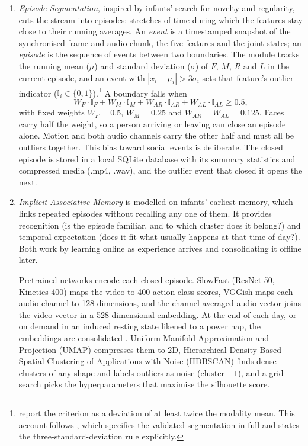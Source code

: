 \begin{enumerate}
    \item \emph{Episode Segmentation}, inspired by infants' search for novelty and regularity, cuts the stream into episodes: stretches of time during which the features stay close to their running averages. An \emph{event} is a timestamped snapshot of the synchronised frame and audio chunk, the five features and the joint states; an \emph{episode} is the sequence of events between two boundaries. The module tracks the running mean ($\mu$) and standard deviation ($\sigma$) of $F$, $M$, $R$ and $L$ in the current episode, and an event with $|x_i - \mu_i| > 3\sigma_i$ sets that feature's outlier indicator ($\mathbb{I}_i \in \{0, 1\}$).\footnote{\citet{Pasquali2026ISEED} report the criterion as a deviation of at least twice the modality mean. This account follows \citet{Pasquali2025AlwaysOn}, which specifies the validated segmentation in full and states the three-standard-deviation rule explicitly.} A boundary falls when
    \begin{equation}
        W_F \cdot \mathbb{I}_F + W_M \cdot \mathbb{I}_M + W_{AR} \cdot \mathbb{I}_{AR} + W_{AL} \cdot \mathbb{I}_{AL} \ge 0.5,
        \label{eq:intro-segmentation}
    \end{equation}
    with fixed weights $W_F = 0.5$, $W_M = 0.25$ and $W_{AR} = W_{AL} = 0.125$. Faces carry half the weight, so a person arriving or leaving can close an episode alone. Motion and both audio channels carry the other half and must all be outliers together. This bias toward social events is deliberate. The closed episode is stored in a local SQLite database with its summary statistics and compressed media (.mp4, .wav), and the outlier event that closed it opens the next.

    \item \emph{Implicit Associative Memory} is modelled on infants' earliest memory, which links repeated episodes without recalling any one of them. It provides recognition (is the episode familiar, and to which cluster does it belong?) and temporal expectation (does it fit what usually happens at that time of day?). Both work by learning online as experience arrives and consolidating it offline later.

    Pretrained networks encode each closed episode. SlowFast (ResNet-50, Kinetics-400) maps the video to 400 action-class scores, VGGish maps each audio channel to 128 dimensions, and the channel-averaged audio vector joins the video vector in a 528-dimensional embedding. At the end of each day, or on demand in an induced resting state likened to a power nap, the embeddings are consolidated \citep{Pasquali2025AlwaysOn}. Uniform Manifold Approximation and Projection (UMAP) compresses them to 2D, Hierarchical Density-Based Spatial Clustering of Applications with Noise (HDBSCAN) finds dense clusters of any shape and labels outliers as noise (cluster $-1$), and a grid search picks the hyperparameters that maximise the silhouette score.


\end{enumerate}
